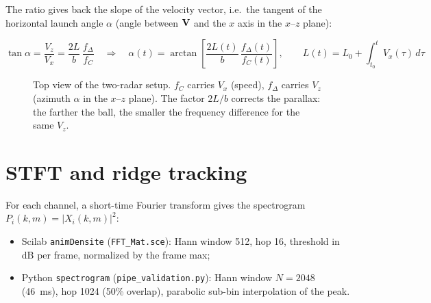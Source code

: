 \documentclass[10pt,a4paper]{report}
\begin{document}
The ratio gives back the slope of the velocity vector, i.e.\ the tangent of the horizontal launch angle $\alpha$ (angle between $\vb V$ and the $x$ axis in the $x$--$z$ plane):

\begin{equation}
\boxed{\tan\alpha = \frac{V_z}{V_x} = \frac{2L}{b}\,\frac{f_\Delta}{f_C}
\quad\Longrightarrow\quad
\alpha(t) = \arctan\!\left[\frac{2L(t)}{b}\,\frac{f_\Delta(t)}{f_C(t)}\right], \qquad
L(t) = L_0 + \int_{t_0}^{t} V_x(\tau)\,d\tau }
\end{equation}

\begin{figure}[H]\centering
{}
\caption{Top view of the two-radar setup. $f_C$ carries $V_x$ (speed), $f_\Delta$ carries $V_z$ (azimuth $\alpha$ in the $x$--$z$ plane). The factor $2L/b$ corrects the parallax: the farther the ball, the smaller the frequency difference for the same $V_z$.}
\label{fig:geom2radars}
\end{figure}

\section{STFT and ridge tracking}

For each channel, a short-time Fourier transform gives the spectrogram $P_i(k,m)=|X_i(k,m)|^2$:
\begin{itemize}
  \item Scilab \texttt{animDensite} (\texttt{FFT\_Mat.sce}): Hann window 512, hop 16, threshold in dB per frame, normalized by the frame max;
  \item Python \texttt{spectrogram} (\texttt{pipe\_validation.py}): Hann window $N=2048$ (46~ms), hop 1024 (50\% overlap), parabolic sub-bin interpolation of the peak.
\end{itemize}
\end{document}
